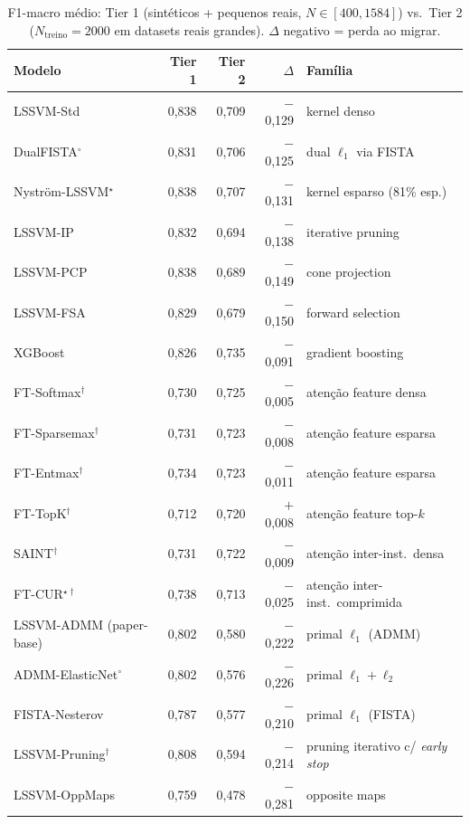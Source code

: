 \documentclass[12pt,a4paper]{article}
\begin{document}
\begin{table}[H]
\centering
\caption{F1-macro médio: Tier 1 (sintéticos + pequenos reais, $N \in [400, 1584]$)
vs.\ Tier 2 ($N_{\text{treino}}=2000$ em datasets reais grandes).
$\Delta$ negativo = perda ao migrar.}
\label{tab:tier1_vs_tier2}
\begin{tabular}{lrrrl}
\toprule
\textbf{Modelo} & \textbf{Tier 1} & \textbf{Tier 2} & \textbf{$\Delta$} & \textbf{Família} \\
\midrule
LSSVM-Std            & 0,838 & 0,709 & $-$0,129 & kernel denso \\
DualFISTA$^\circ$    & 0,831 & 0,706 & $-$0,125 & dual $\ell_1$ via FISTA \\
Nyström-LSSVM$^\star$ & 0,838 & 0,707 & $-$0,131 & kernel esparso (81\% esp.) \\
LSSVM-IP             & 0,832 & 0,694 & $-$0,138 & iterative pruning \\
LSSVM-PCP            & 0,838 & 0,689 & $-$0,149 & cone projection \\
LSSVM-FSA            & 0,829 & 0,679 & $-$0,150 & forward selection \\
\midrule
XGBoost              & 0,826 & 0,735 & $-$0,091 & gradient boosting \\
FT-Softmax$^\dagger$ & 0,730 & 0,725 & $-$0,005 & atenção feature densa \\
FT-Sparsemax$^\dagger$ & 0,731 & 0,723 & $-$0,008 & atenção feature esparsa \\
FT-Entmax$^\dagger$  & 0,734 & 0,723 & $-$0,011 & atenção feature esparsa \\
FT-TopK$^\dagger$    & 0,712 & 0,720 & $+$0,008 & atenção feature top-$k$ \\
SAINT$^\dagger$      & 0,731 & 0,722 & $-$0,009 & atenção inter-inst.\ densa \\
FT-CUR$^{\star\dagger}$ & 0,738 & 0,713 & $-$0,025 & atenção inter-inst.\ comprimida \\
\midrule
LSSVM-ADMM (paper-base)  & 0,802 & 0,580 & $-$0,222 & primal $\ell_1$ (ADMM) \\
ADMM-ElasticNet$^\circ$ & 0,802 & 0,576 & $-$0,226 & primal $\ell_1+\ell_2$ \\
FISTA-Nesterov            & 0,787 & 0,577 & $-$0,210 & primal $\ell_1$ (FISTA) \\
LSSVM-Pruning$^\dagger$   & 0,808 & 0,594 & $-$0,214 & pruning iterativo c/ \emph{early stop} \\
LSSVM-OppMaps             & 0,759 & 0,478 & $-$0,281 & opposite maps \\
\bottomrule
\end{tabular}
\end{table}
\end{document}
